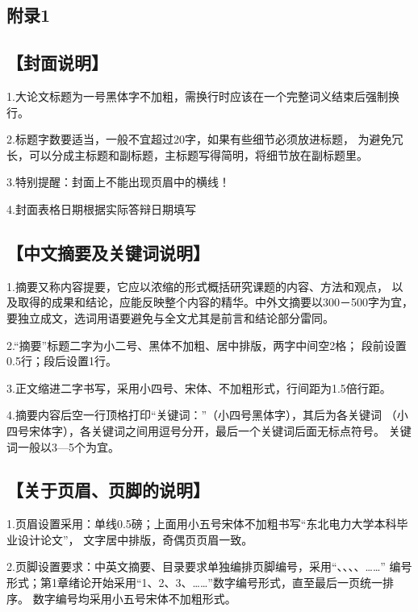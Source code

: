 
\begin{appendices}

    \section*{附录1  }
    \subsection*{【封面说明】}
    1.大论文标题为一号黑体字不加粗，需换行时应该在一个完整词义结束后强制换行。

    2.标题字数要适当，一般不宜超过20字，如果有些细节必须放进标题，
    为避免冗长，可以分成主标题和副标题，主标题写得简明，将细节放在副标题里。

    3.特别提醒：封面上不能出现页眉中的横线！

    4.封面表格日期根据实际答辩日期填写

    \subsection*{【中文摘要及关键词说明】}
    1.摘要又称内容提要，它应以浓缩的形式概括研究课题的内容、方法和观点，
    以及取得的成果和结论，应能反映整个内容的精华。中外文摘要以300－500字为宜，
    要独立成文，选词用语要避免与全文尤其是前言和结论部分雷同。

    2.“摘要”标题二字为小二号、黑体不加粗、居中排版，两字中间空2格；
    段前设置0.5行；段后设置1行。

    3.正文缩进二字书写，采用小四号、宋体、不加粗形式，行间距为1.5倍行距。

    4.摘要内容后空一行顶格打印“关键词：”（小四号黑体字），其后为各关键词
    （小四号宋体字），各关键词之间用逗号分开，最后一个关键词后面无标点符号。
    关键词一般以3—5个为宜。

    \subsection*{【关于页眉、页脚的说明】}
    1.页眉设置采用：单线0.5磅；上面用小五号宋体不加粗书写“东北电力大学本科毕业设计论文”，
    文字居中排版，奇偶页页眉一致。

    2.页脚设置要求：中英文摘要、目录要求单独编排页脚编号，采用“\uppercase\expandafter{}、\uppercase\expandafter{}、\uppercase\expandafter{}、\uppercase\expandafter{}、……”
    编号形式；第1章绪论开始采用“1、2、3、……”数字编号形式，直至最后一页统一排序。
    数字编号均采用小五号宋体不加粗形式。


\end{appendices}
